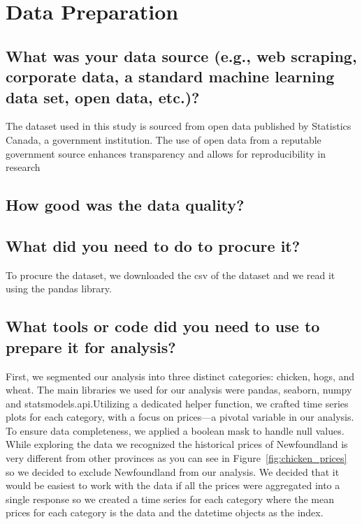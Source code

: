 \section{Data Preparation}

\subsection{What was your data source (e.g., web scraping, corporate data, a standard machine learning data set, open data, etc.)?}

The dataset used in this study is sourced from open data published by Statistics Canada, a government institution. The use of open data from a reputable government source enhances transparency and allows for reproducibility in research

\subsection{How good was the data quality?}



\subsection{What did you need to do to procure it?}

To procure the dataset, we downloaded the csv of the dataset and we read it using the pandas library.

\subsection{What tools or code did you need to use to prepare it for analysis?}

First, we segmented our analysis into three distinct categories: chicken, hogs, and wheat. The main libraries we used for our analysis were pandas, seaborn, numpy and statsmodels.api.Utilizing a dedicated helper function, we crafted time series plots for each category, with a focus on prices—a pivotal variable in our analysis. To ensure data completeness, we applied a boolean mask to handle null values. While exploring the data we recognized the historical prices of Newfoundland is very different from other provinces as you can see in Figure~\ref{fig:chicken_prices} so we decided to exclude Newfoundland from our analysis. We decided that it would be easiest to work with the data if all the prices were aggregated into a single response so we created a time series for each category where the mean prices for each category is the data and the datetime objects as the index.

